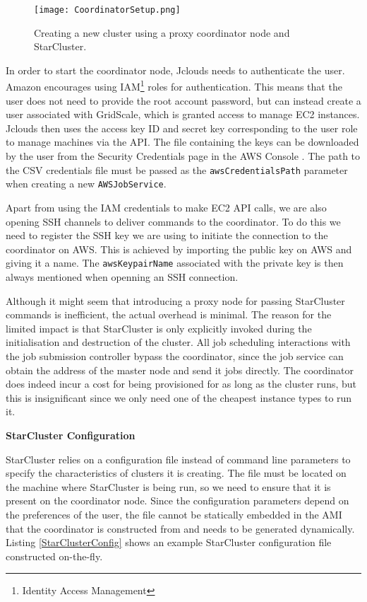 \begin{figure}[h]
	\centering
		\texttt{[image: CoordinatorSetup.png]}
	\caption{Creating a new cluster using a proxy coordinator node and StarCluster.}
	\label{CoordinatorSetup}
\end{figure}

In order to start the coordinator node, Jclouds needs to authenticate the user. Amazon encourages using IAM\footnote{Identity Access Management} roles for authentication. This means that the user does not need to provide the root account password, but can instead create a user associated with GridScale, which is granted access to manage EC2 instances. Jclouds then uses the access key ID and secret key corresponding to the user role to manage machines via the API. The file containing the keys can be downloaded by the user from the Security Credentials page in the AWS Console \cite{AWSCredentials}. The path to the CSV credentials file must be passed as the \verb|awsCredentialsPath| parameter when creating a new \verb|AWSJobService|.

Apart from using the IAM credentials to make EC2 API calls, we are also opening SSH channels to deliver commands to the coordinator. To do this we need to register the SSH key we are using to initiate the connection to the coordinator on AWS. This is achieved by importing the public key on AWS and giving it a name. The \verb|awsKeypairName| associated with the private key is then always mentioned when openning an SSH connection.

Although it might seem that introducing a proxy node for passing StarCluster commands is inefficient, the actual overhead is minimal. The reason for the limited impact is that StarCluster is only explicitly invoked during the initialisation and destruction of the cluster. All job scheduling interactions with the job submission controller bypass the coordinator, since the job service can obtain the address of the master node and send it jobs directly. The coordinator does indeed incur a cost for being provisioned for as long as the cluster runs, but this is insignificant since we only need one of the cheapest instance types to run it.

\vspace{3mm}
\textbf{StarCluster Configuration}
\vspace{1mm}

StarCluster relies on a configuration file instead of command line parameters to specify the characteristics of clusters it is creating. The file must be located on the machine where StarCluster is being run, so we need to ensure that it is present on the coordinator node. Since the configuration parameters depend on the preferences of the user, the file cannot be statically embedded in the AMI that the coordinator is constructed from and needs to be generated dynamically. Listing \ref{StarClusterConfig} shows an example StarCluster configuration file constructed on-the-fly.

